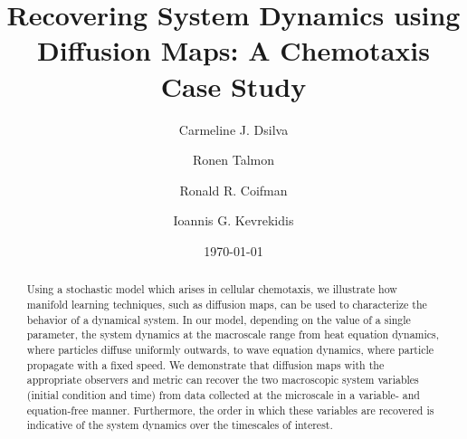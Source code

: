 \documentclass[prl, reprint, final, showkeys]{revtex4-1}
\begin{document}
\title{Recovering System Dynamics using Diffusion Maps: A Chemotaxis Case Study}

\author{Carmeline J. Dsilva}

\author{Ronen Talmon}

\author{Ronald R. Coifman}

\author{Ioannis G. Kevrekidis}

\date{\today}

\begin{abstract}

Using a stochastic model which arises in cellular chemotaxis, we illustrate how manifold learning techniques, such as diffusion maps, can be used to characterize the behavior of a dynamical system.
%
In our model, depending on the value of a single parameter, the system dynamics at the macroscale range from heat equation dynamics, where particles diffuse uniformly outwards, to wave equation dynamics, where particle propagate with a fixed speed. 
%
We demonstrate that diffusion maps with the appropriate observers and metric can recover the two macroscopic system variables (initial condition and time) from data collected at the microscale in a variable- and equation-free manner. 
%
Furthermore, the order in which these variables are recovered is indicative of the system dynamics over the timescales of interest.
%
%
%
%	
%

\end{abstract}
\end{document}
